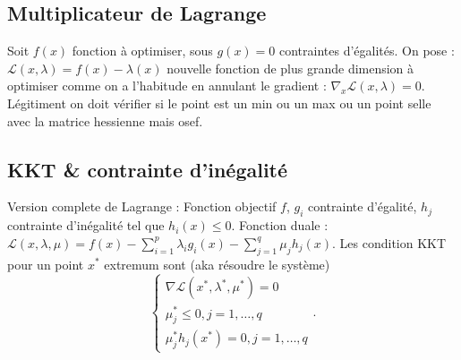 \documentclass{article}
\begin{document}
\subsection{Multiplicateur de Lagrange}
Soit $ f(x) $ fonction à optimiser, sous $ g(x) = 0 $ contraintes d'égalités. On pose : $ \mathcal{L}(x,\lambda) = f(x) - \lambda  (x)$ nouvelle fonction de plus grande dimension à optimiser comme on a l'habitude en annulant le gradient : $ \nabla _x \mathcal{L}(x,\lambda ) = 0 $. Légitiment on doit vérifier si le point est un min ou un max ou un point selle avec la matrice hessienne mais osef.

\subsection{KKT \& contrainte d'inégalité}
Version complete de Lagrange : Fonction objectif $ f $, $ g_i $ contrainte d'égalité, $ h_j $ contrainte d'inégalité tel que $ h_i(x) \leq 0 $. Fonction duale : $ \mathcal{L} (x, \lambda , \mu) = f(x) - \sum_{i=1}^{p} \lambda _i g_i(x) - \sum_{j=1}^{q} \mu _j h_j(x)$. Les condition KKT pour un point $ x^* $ extremum sont (aka résoudre le système)
\[
    \begin{cases}
    \nabla \mathcal{L}(x^*, \lambda^* , \mu^* ) = 0 \\
    \mu ^*_j \leq 0, j = 1, \dots, q \\
    \mu ^*_j h_j(x^*) = 0, j =1, \dots, q
    \end{cases} 
.\]
\end{document}

